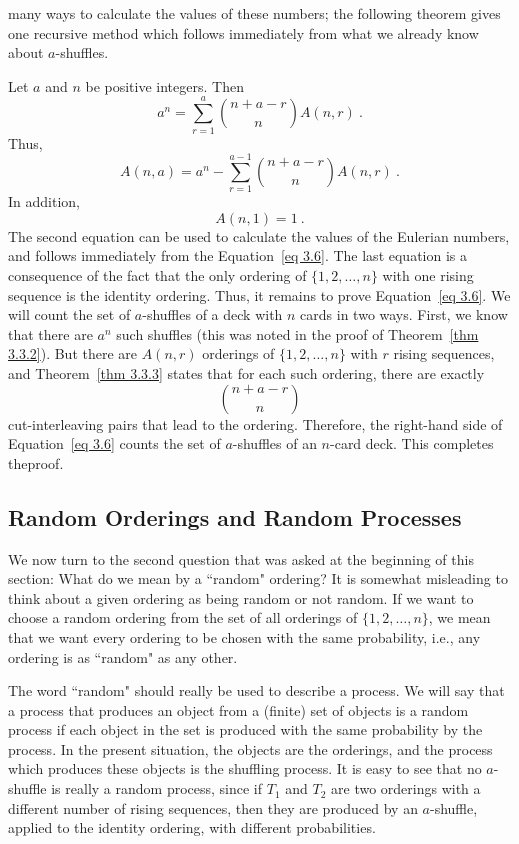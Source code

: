 many ways to calculate the values of these numbers; the following theorem gives one recursive
method which follows immediately from what we already know about $a$-shuffles.
\begin{theorem}\label{thm 3.3.4}  Let $a$ and $n$ be positive integers.  Then
\begin{equation}
a^n = \sum_{r = 1}^a {{n + a - r}\choose{n}}A(n, r)\ .
\label{eq 3.6}
\end{equation}
Thus,
$$
A(n, a) = a^n - \sum_{r = 1}^{a-1}{{n + a - r}\choose{n}}A(n, r)\ .
$$
In addition,
$$A(n, 1) = 1\ .$$
\proof  The second equation can be used to calculate the values of the Eulerian
numbers, and follows immediately from the Equation~\ref{eq 3.6}.  The last equation is a
consequence of the fact that the only ordering of $\{1, 2, \ldots, n\}$ with one rising
sequence is the identity ordering.  Thus, it remains to prove Equation~\ref{eq 3.6}.
We will count the set of $a$-shuffles of a deck with $n$ cards in two ways.  First, we 
know that there are $a^n$ such shuffles (this was noted in the proof of 
Theorem~\ref{thm 3.3.2}).  But there are $A(n, r)$ orderings of $\{1, 2, \ldots, n\}$ 
with $r$ rising sequences, and Theorem~\ref{thm 3.3.3} states that for each such ordering,
there are exactly
$${{n+a-r}\choose n}$$ 
cut-interleaving pairs that lead to the ordering.  Therefore, the right-hand side of 
Equation~\ref{eq 3.6} counts the set of $a$-shuffles of an $n$-card deck.
This completes the\linebreak[4] proof.
\end{theorem}
\subsection*{Random Orderings and Random Processes}
We now turn to the second question that was asked at the beginning of
this section:  What do we mean by a ``random" ordering?  It is somewhat misleading to think about a given ordering as being
random or not random.  If we want to choose a random ordering from the set of all orderings of $\{1,
2, \ldots, n\}$, we mean that we want every ordering to be chosen with the same probability, i.e., any
ordering is as ``random" as any other.
\par The word ``random" should really be used to describe a process.  We will say that
a process that produces an object from a (finite) set of objects is a random
process if each object in the set is produced with the
same probability by the process.  In the present situation, the objects are the orderings, and the
process which produces these objects is the shuffling process.  It is easy to see that no $a$-shuffle
is really a random process, since if $T_1$ and $T_2$ are two orderings with a different
number of rising sequences, then they are produced by an $a$-shuffle, applied to the
identity ordering, with different probabilities.
